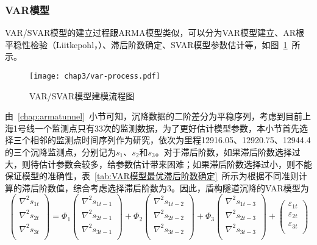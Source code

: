 \subsubsection{VAR模型}

VAR/SVAR模型的建立过程跟ARMA模型类似，可以分为VAR模型建立、AR根平稳性检验（Liitkepohl，\citeyear{liitkepohl1991introduction}）、滞后阶数确定、SVAR模型参数估计等，如图~\ref{fig:VARSVAR模型建模流程图}~所示。

\begin{figure}[htb!]
    \centering
    \texttt{[image: chap3/var-process.pdf]}
    \caption{VAR/SVAR模型建模流程图}
    \label{fig:VARSVAR模型建模流程图}
\end{figure}

由~\ref{chap:armatunnel}~小节可知，沉降数据的二阶差分为平稳序列，考虑到目前上海1号线一个监测点只有33次的监测数据，为了更好估计模型参数，本小节首先选择三个相邻的监测点时间序列作为研究，依次为里程12916.05、12920.75、12944.4的三个沉降监测点，分别记为$s_1$、$s_2$和$s_3$。对于滞后阶数，如果滞后阶数选择过大，则待估计参数会较多，给参数估计带来困难；如果滞后阶数选择过小，则不能保证模型的准确性，表~\ref{tab:VAR模型最优滞后阶数确定}~所示为根据不同准则计算的滞后阶数值，综合考虑选择滞后阶数为3。因此，盾构隧道沉降的VAR模型为
\begin{equation}
	\label{equ:var}
	\left( \begin{matrix}
   {{\nabla }^{2}}{{s}_{1t}}  \\
   {{\nabla }^{2}}{{s}_{2t}}  \\
   {{\nabla }^{2}}{{s}_{3t}}  \\
\end{matrix} \right)={{\Phi }_{1}}\left( \begin{matrix}
   {{\nabla }^{2}}{{s}_{1t-1}}  \\
   {{\nabla }^{2}}{{s}_{2t-1}}  \\
   {{\nabla }^{2}}{{s}_{3t-1}}  \\
\end{matrix} \right)+{{\Phi }_{2}}\left( \begin{matrix}
   {{\nabla }^{2}}{{s}_{1t-2}}  \\
   {{\nabla }^{2}}{{s}_{2t-2}}  \\
   {{\nabla }^{2}}{{s}_{3t-2}}  \\
\end{matrix} \right)+{{\Phi }_{3}}\left( \begin{matrix}
   {{\nabla }^{2}}{{s}_{1t-3}}  \\
   {{\nabla }^{2}}{{s}_{2t-3}}  \\
   {{\nabla }^{2}}{{s}_{3t-3}}  \\
\end{matrix} \right)+\left( \begin{matrix}
   {{\varepsilon }_{1t}}  \\
   {{\varepsilon }_{2t}}  \\
   {{\varepsilon }_{3t}}  \\
\end{matrix} \right)
\end{equation}

